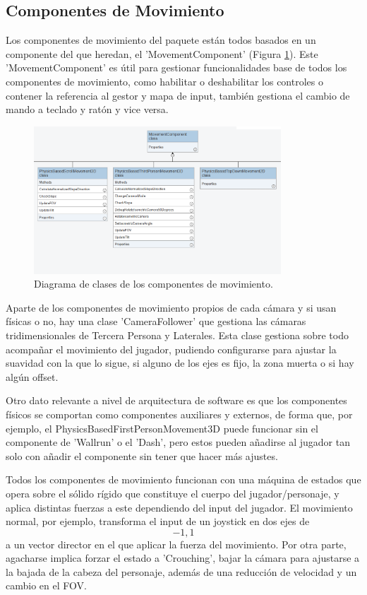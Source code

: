 \subsection{Componentes de Movimiento}
Los componentes de movimiento del paquete están todos basados en un componente del que heredan, el 'MovementComponent' (Figura \ref{fig:umlMovimiento}). Este 'MovementComponent' 
es útil para gestionar funcionalidades base de todos los componentes de movimiento, como habilitar o deshabilitar los controles o contener la referencia al gestor y mapa de input, 
también gestiona el cambio de mando a teclado y ratón y vice versa.

\begin{figure}[H]
  \centering
    \includegraphics[width=350px,clip=true]{Movement.png}
  \caption{Diagrama de clases de los componentes de movimiento.}
  \label{fig:umlMovimiento}
\end{figure}

Aparte de los componentes de movimiento propios de cada cámara y si usan físicas o no, hay una clase 'CameraFollower' que gestiona las cámaras tridimensionales de Tercera Persona 
y Laterales. Esta clase gestiona sobre todo acompañar el movimiento del jugador, pudiendo configurarse para ajustar la suavidad con la que lo sigue, si alguno de los ejes 
es fijo, la zona muerta o si hay algún offset.

Otro dato relevante a nivel de arquitectura de software es que los componentes físicos se comportan como componentes auxiliares y externos, de forma que, por ejemplo,
 el PhysicsBasedFirstPersonMovement3D puede funcionar sin el componente de 'Wallrun' o el 'Dash', pero estos pueden añadirse al jugador tan solo con añadir el componente sin
 tener que hacer más ajustes.
 
Todos los componentes de movimiento funcionan con una máquina de estados que opera sobre el sólido rígido que constituye el cuerpo del jugador/personaje, y aplica distintas 
fuerzas a este dependiendo del input del jugador. El movimiento normal, por ejemplo, transforma el input de un joystick en dos ejes de \[-1,1\] a un vector director en el que 
aplicar la fuerza del movimiento. Por otra parte, agacharse implica forzar el estado a 'Crouching', bajar la cámara para ajustarse a la bajada de la cabeza del personaje, además de una reducción de velocidad y
un cambio en el FOV.

